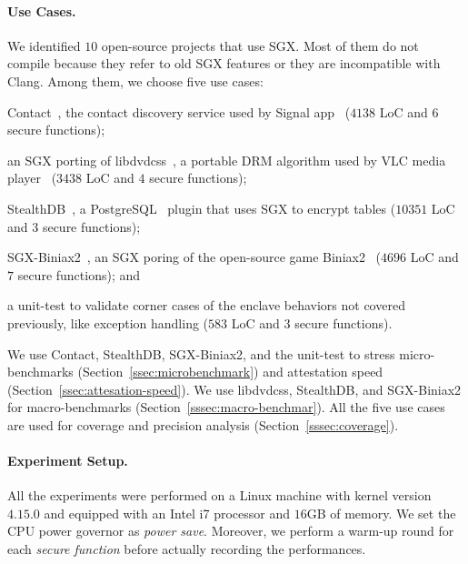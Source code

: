 \paragraph{Use Cases.}
We identified $10$ open-source projects that use SGX. 
Most of them do not compile because they refer to old SGX 
features or they are incompatible with Clang.
Among them, we choose five use cases:
\begin{enumerate*}[label=(\roman*)]
	\item \textsf{Contact}~\citep{signalrepo}, the contact discovery service 
	used 
	by Signal app~\citep{signalapp} ($4138$ LoC and $6$ secure functions); 
	\item an SGX porting of \textsf{libdvdcss}~\citep{libdvdcss}, a portable 
	DRM 
	algorithm used by VLC media player~\citep{videolan} ($3438$ LoC and $4$ 
	secure functions); 
	\item \textsf{StealthDB}~\citep{stealthdb}, a 
	PostgreSQL~\citep{momjian2001postgresql} plugin that uses SGX to encrypt
	tables ($10351$ LoC and $3$ secure functions);
	\item \textsf{SGX-Biniax2}~\citep{bauman2016case}, an SGX poring of the 
	open-source game Biniax2~\citep{biniax2} ($4696$ LoC and $7$ secure 	
	functions); and
	\item a \textsf{unit-test} to validate corner cases of the enclave 
	behaviors not covered previously, like 
	exception handling ($583$ LoC and $3$ secure functions).
\end{enumerate*}
We use \textsf{Contact}, \textsf{StealthDB}, \textsf{SGX-Biniax2}, and the 
\textsf{unit-test} to stress micro-benchmarks 
(Section~\ref{ssec:microbenchmark}) and attestation speed 
(Section~\ref{ssec:attesation-speed}).
We use \textsf{libdvdcss}, \textsf{StealthDB}, and \textsf{SGX-Biniax2} for 
macro-benchmarks (Section~\ref{sssec:macro-benchmar}).
All the five use cases are used for coverage and precision analysis 
(Section~\ref{sssec:coverage}).

\paragraph{Experiment Setup.}
All the experiments were performed on a Linux machine with kernel version 
$4.15.0$ and equipped with an Intel i7 processor and $16$GB of memory.
We set the CPU power governor as \emph{power save}.
Moreover, we perform a warm-up round for each \emph{secure function} before 
actually recording the performances.

